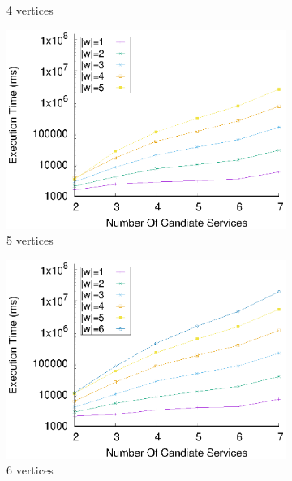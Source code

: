 \begin{figure}[!ht]
\begin{subfigure}{0.45\textwidth}
        \caption{4 vertices}
        \label{fig:time_window_perce_wide_4n}
      \end{subfigure}
      \hfill
      \begin{subfigure}{0.45\textwidth}
        \includegraphics[width=\textwidth]{Images/graphs/window_time_performance_qualitative_n7_s7_50_80_n5}
        \caption{5 vertices}
        \label{fig:time_window_perce_wide_5n}
      \end{subfigure}
      \hfill
      \begin{subfigure}{0.45\textwidth}
        \includegraphics[width=\textwidth]{Images/graphs/window_time_performance_qualitative_n7_s7_50_80_n6}
        \caption{6 vertices}
        \label{fig:time_window_perce_wide_6n}
      \end{subfigure}
      \begin{subfigure}{0.45\textwidth}

\end{subfigure}
\end{figure}
